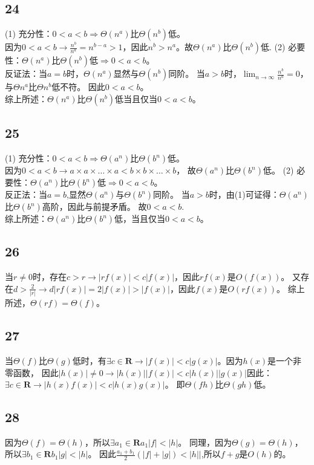 \documentclass{article}
\begin{document}
\subsection{24}
(1) 充分性：$0 < a < b \Rightarrow \Theta(n^a)$比$\Theta(n^b)$低。\\
因为$0 < a < b \rightarrow \frac{n^b}{n^a} = n^{b - a} > 1$，因此$n^b > n^a$。故$\Theta(n^a)$比$\Theta(n^b)$低.
(2) 必要性：$\Theta(n^a)$比$\Theta(n^b)$低$\Rightarrow 0 < a < b$。\\
反证法：当$a = b$时，$\Theta(n^a)$显然与$\Theta(n^b)$同阶。
当$a > b$时，$\lim_{n \rightarrow \infty} \frac{n^b}{n^a} = 0$，与$\Theta{n^a}$比$\Theta{n^b}$低不符。
因此$0 < a < b$。\\
综上所述：$\Theta(n^a)$比$\Theta(n^b)$低当且仅当$0 < a < b$。
\subsection{25}
(1) 充分性：$0 < a < b \Rightarrow \Theta(a^n)$比$\Theta(b^n)$低。\\
因为$0 < a < b \rightarrow a \times a \times \dots \times a < b \times b \times \dots \times b$，
故$\Theta(a^n)$比$\Theta(b^n)$低。
(2) 必要性：$\Theta(a^n)$比$\Theta(b^n)$低$\Rightarrow 0 < a < b$。\\
反正法：当$a = b$,显然$\Theta(a^n)$与$\Theta(b^n)$同阶。
当$a > b$时，由(1)可证得：$\Theta(a^n)$比$\Theta(b^n)$高阶，因此与前提矛盾。
故$0 < a < b$.\\
综上所述：$\Theta(a^n)$比$\Theta(b^n)$低，当且仅当$0 < a < b$。
\subsection{26}
当$r \neq 0$时，存在$c > r \rightarrow |rf(x)| < c|f(x)|$，因此$rf(x)$是$O(f(x))$。
又存在$d > \frac{2}{|r|} \rightarrow d|rf(x)| = 2|f(x)| > |f(x)|$，因此$f(x)$是$O(rf(x))$。
综上所述，$\Theta(rf) = \Theta(f)$。
\subsection{27}
当$\Theta(f)$比$\Theta(g)$低时，有$\exists c \in \mathbf{R} \rightarrow |f(x)| < c|g(x)|$。因为$h(x)$是一个非零函数，
因此$|h(x)| \neq 0 \rightarrow |h(x)||f(x)| < c|h(x)||g(x)|$因此：$\exists c \in \mathbf{R} \rightarrow |h(x)f(x)| < c|h(x)g(x)|$。
即$\Theta(fh)$比$\Theta(gh)$低。
\subsection{28}
因为$\Theta(f) = \Theta(h)$，所以$\exists a_1 \in \mathbf{R} a_1|f| < |h|$。
同理，因为$\Theta(g) = \Theta(h)$，所以$\exists b_1 \in \mathbf{R} b_1 |g| < |h|$。
因此$\frac{a_1 + b_1}{2}(|f| + |g|) < |h||$,所以$f + g$是$O(h)$的。
\end{document}
